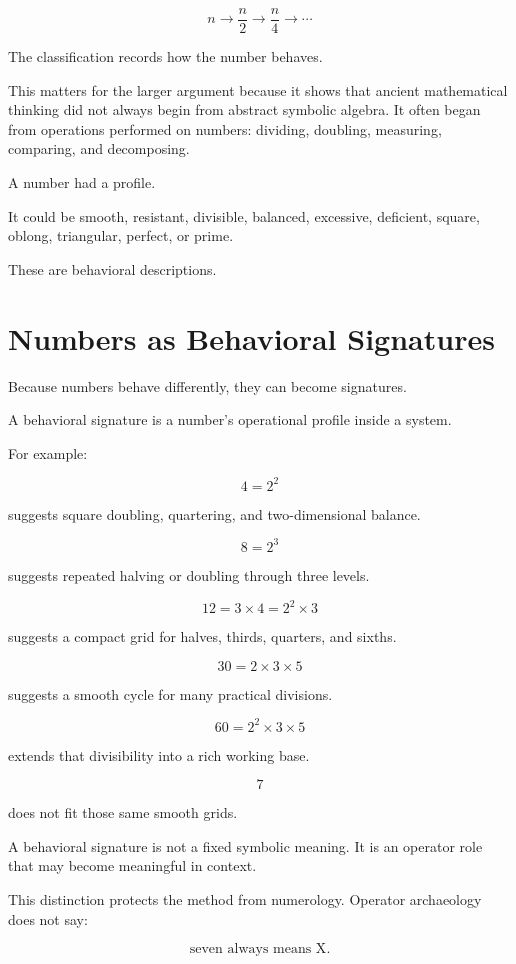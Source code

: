 \documentclass[11pt]{book}
\begin{document}
\[
n \longrightarrow \frac{n}{2} \longrightarrow \frac{n}{4} \longrightarrow \cdots
\]

The classification records how the number behaves.

This matters for the larger argument because it shows that ancient mathematical thinking did not always begin from abstract symbolic algebra. It often began from operations performed on numbers: dividing, doubling, measuring, comparing, and decomposing.

A number had a profile.

It could be smooth, resistant, divisible, balanced, excessive, deficient, square, oblong, triangular, perfect, or prime.

These are behavioral descriptions.

\section{Numbers as Behavioral Signatures}

Because numbers behave differently, they can become signatures.

A behavioral signature is a number's operational profile inside a system.

For example:

\[
4 = 2^2
\]

suggests square doubling, quartering, and two-dimensional balance.

\[
8 = 2^3
\]

suggests repeated halving or doubling through three levels.

\[
12 = 3 \times 4 = 2^2 \times 3
\]

suggests a compact grid for halves, thirds, quarters, and sixths.

\[
30 = 2 \times 3 \times 5
\]

suggests a smooth cycle for many practical divisions.

\[
60 = 2^2 \times 3 \times 5
\]

extends that divisibility into a rich working base.

\[
7
\]

does not fit those same smooth grids.

A behavioral signature is not a fixed symbolic meaning. It is an operator role that may become meaningful in context.

This distinction protects the method from numerology. Operator archaeology does not say:

\[
\text{seven always means X}.
\]
\end{document}
